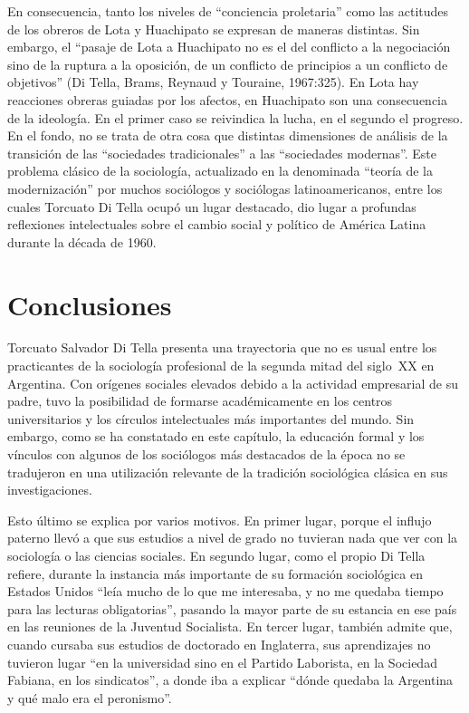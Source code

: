 En consecuencia, tanto los niveles de \enquote{conciencia proletaria} como las actitudes de los obreros de Lota y Huachipato se expresan de maneras distintas. Sin embargo, el \enquote{pasaje de Lota a Huachipato no es el del conflicto a la negociación sino de la ruptura a la oposición, de un conflicto de principios a un conflicto de objetivos} (Di Tella, Brams, Reynaud y Touraine, 1967:325). En Lota hay reacciones obreras guiadas por los afectos, en Huachipato son una consecuencia de la ideología. En el primer caso se reivindica la lucha, en el segundo el progreso. En el fondo, no se trata de otra cosa que distintas dimensiones de análisis de la transición de las \enquote{sociedades tradicionales} a las \enquote{sociedades modernas}. Este problema clásico de la sociología, actualizado en la denominada \enquote{teoría de la modernización} por muchos sociólogos y sociólogas latinoamericanos, entre los cuales Torcuato Di Tella ocupó un lugar destacado, dio lugar a profundas reflexiones intelectuales sobre el cambio social y político de América Latina durante la década de 1960.

\section{Conclusiones}

Torcuato Salvador Di Tella presenta una trayectoria que no es usual entre los practicantes de la sociología profesional de la segunda mitad del siglo~XX en Argentina. Con orígenes sociales elevados debido a la actividad empresarial de su padre, tuvo la posibilidad de formarse académicamente en los centros universitarios y los círculos intelectuales más importantes del mundo. Sin embargo, como se ha constatado en este capítulo, la educación formal y los vínculos con algunos de los sociólogos más destacados de la época no se tradujeron en una utilización relevante de la tradición sociológica clásica en sus investigaciones.

Esto último se explica por varios motivos. En primer lugar, porque el influjo paterno llevó a que sus estudios a nivel de grado no tuvieran nada que ver con la sociología o las ciencias sociales. En segundo lugar, como el propio Di Tella refiere, durante la instancia más importante de su formación sociológica en Estados Unidos \enquote{leía mucho de lo que me interesaba, y no me quedaba tiempo para las lecturas obligatorias}, pasando la mayor parte de su estancia en ese país en las reuniones de la Juventud Socialista. En tercer lugar, también admite que, cuando cursaba sus estudios de doctorado en Inglaterra, sus aprendizajes no tuvieron lugar \enquote{en la universidad sino en el Partido Laborista, en la Sociedad Fabiana, en los sindicatos}, a donde iba a explicar \enquote{dónde quedaba la Argentina y qué malo era el peronismo}.

